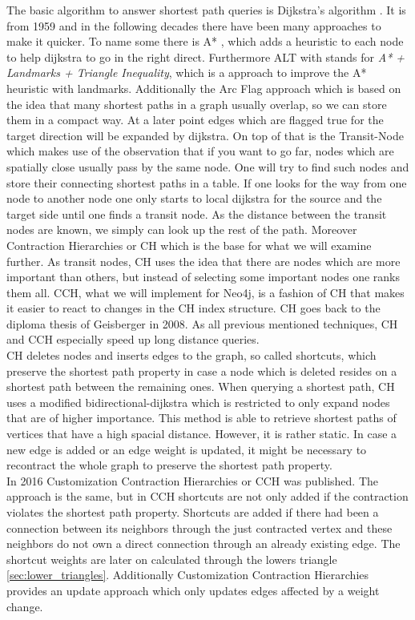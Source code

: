 The basic algorithm to answer shortest path queries is Dijkstra's algorithm \cite{Dijkstra_1959}.
It is from 1959 and in the following decades there have been many approaches to make it quicker.
To name some there is A* \cite{A_Star}, which adds a heuristic to each node to help dijkstra to go in the right direct.
Furthermore ALT \cite{ALT} with stands for \textit{A* + Landmarks + Triangle Inequality}, which is a approach to improve the A* heuristic with landmarks.
Additionally the Arc Flag \cite{ARC_FLAG} approach which is based on the idea that many shortest paths in a graph usually overlap, so we can store them in a compact way.
At a later point edges which are flagged true for the target direction will be expanded by dijkstra.
On top of that is the Transit-Node \cite{Bast_2007} which makes use of the observation that if you want to go far, nodes which are spatially close usually pass by the same node.
One will try to find such nodes and store their connecting shortest paths in a table.
If one looks for the way from one node to another node one only starts to local dijkstra for the source and the target side until one finds a transit node.
As the distance between the transit nodes are known, we simply can look up the rest of the path.
Moreover Contraction Hierarchies \cite{Geisberger_2012} or CH which is the base for what we will examine further.
As transit nodes, CH uses the idea that there are nodes which are more important than others, but instead of selecting some important nodes one ranks them all.
CCH, what we will implement for Neo4j, is a fashion of CH that makes it easier to react to changes in the CH index structure.
CH goes back to the diploma thesis of Geisberger \cite{Geisberger} in 2008.
As all previous mentioned techniques, CH and CCH especially speed up long distance queries.
\\ 
CH deletes nodes and inserts edges to the graph, so called shortcuts, which preserve the shortest path property in case a node which is deleted resides on a shortest path between the remaining ones.
When querying a shortest path, CH uses a modified bidirectional-dijkstra which is restricted to only expand nodes that are of higher importance.
This method is able to retrieve shortest paths of vertices that have a high spacial distance.
However, it is rather static.
In case a new edge is added or an edge weight is updated, it might be necessary to recontract the whole graph to preserve the shortest path property.
\\
In 2016 Customization Contraction Hierarchies \cite{CCH} or CCH was published.
The approach is the same, but in CCH shortcuts are not only added if the contraction violates the shortest path property.
Shortcuts are added if there had been a connection between its neighbors through the just contracted vertex and these neighbors do not own a direct connection through an already existing edge.
The shortcut weights are later on calculated through the lowers triangle \ref{sec:lower_triangles}.
Additionally Customization Contraction Hierarchies \cite{CCH} provides an update approach which only updates edges affected by a weight change.


